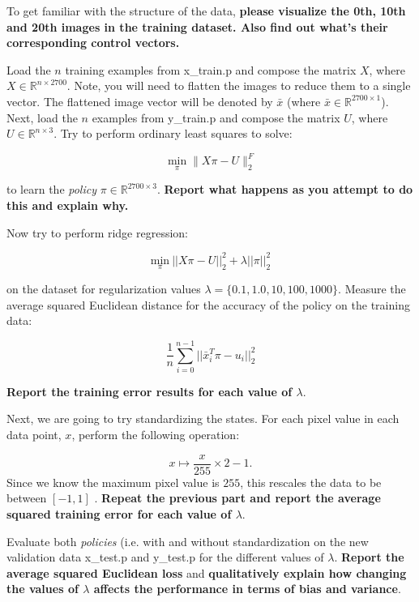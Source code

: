 \documentclass[preview]{standalone}
\begin{document}
\begin{Parts}
\Part To get familiar with the structure of the data, \textbf{please visualize the 0th, 10th and 20th images in the training dataset. Also find out what's their corresponding control vectors. }



\Part Load the $n$ training examples from x\_train.p and compose the matrix $X$, where $X \in \mathbb{R}^{n\times 2700}$. Note, you will need to flatten the images to reduce them to a single vector. The flattened image vector will be denoted by $\bar{x}$ (where $\bar{x} \in \mathbb{R}^{2700\times 1}$). Next, load the $n$ examples from y\_train.p and compose the matrix $U$, where $U \in \mathbb{R}^{n\times 3}$. Try to perform ordinary least squares to solve:  

$$\min_{\pi} \|X\pi-U \|^F_2$$

to learn the \emph{policy} $\pi \in \mathbb{R}^{2700 \times 3}$. {\bf Report what happens as you attempt to do this and explain why.}



\Part Now try to perform ridge regression:

$$\underset{\pi}{\mbox{min}} \: ||X\pi-U||^2_2 + \lambda ||\pi||^2_2$$

on the dataset for regularization values $\lambda = \lbrace 0.1,1.0,10,100,1000 \rbrace$. Measure the average squared Euclidean distance for the accuracy of the policy on the training data:

$$\frac{1}{n}\sum_{i =0 }^{n-1} ||\bar{x}_i^T \pi - u_i||^2_2$$ 

{\bf Report the training error results for each value of $\lambda$}.



\Part Next, we are going to try standardizing the states. For each pixel value in each data point, $x$, perform the following operation: 

	$$x \mapsto \frac{x}{255} \times 2 - 1.$$
 Since we know the maximum pixel value is $255$, this rescales the data to be between $[-1,1]$ . {\bf Repeat the previous part and report the average squared training error for each value of $\lambda$}.



\Part Evaluate both \emph{policies} (i.e. with and without standardization on the new validation data x\_test.p and y\_test.p for the different values of $\lambda$. {\bf Report the average squared Euclidean loss} and {\bf qualitatively explain how changing the values of $\lambda$ affects the performance in terms of bias and variance}. 





\end{Parts}
\end{document}
